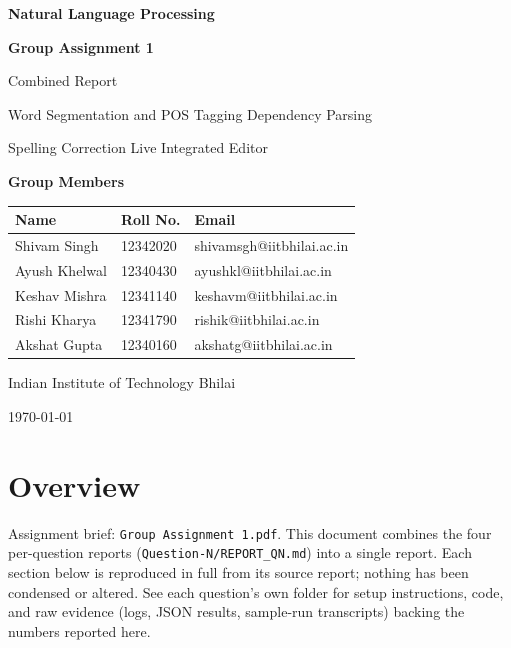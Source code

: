 \documentclass[11pt,a4paper]{article}
\begin{document}
\begin{titlepage}
\centering
\vspace*{3cm}
{\Huge\bfseries Natural Language Processing\par}
\vspace{6pt}
{\Huge\bfseries Group Assignment 1\par}
\vspace{18pt}
{\LARGE Combined Report\par}
\vspace{10pt}
{\large Word Segmentation and POS Tagging \textperiodcentered{} Dependency Parsing\par}
{\large Spelling Correction \textperiodcentered{} Live Integrated Editor\par}
\vspace{28pt}
{\large\bfseries Group Members\par}
\vspace{8pt}
\begin{tabular}{lll}
\toprule
\textbf{Name} & \textbf{Roll No.} & \textbf{Email} \\
\midrule
Shivam Singh   & 12342020 & shivamsgh@iitbhilai.ac.in \\
Ayush Khelwal  & 12340430 & ayushkl@iitbhilai.ac.in \\
Keshav Mishra  & 12341140 & keshavm@iitbhilai.ac.in \\
Rishi Kharya   & 12341790 & rishik@iitbhilai.ac.in \\
Akshat Gupta   & 12340160 & akshatg@iitbhilai.ac.in \\
\bottomrule
\end{tabular}
\vfill
{\large Indian Institute of Technology Bhilai\par}
\vspace{4pt}
{\large \today\par}
\end{titlepage}

\tableofcontents
\clearpage
\section*{Overview}

Assignment brief: \texttt{Group Assignment 1.\allowbreak{}pdf}. This document combines the four per-question reports (\texttt{Question-\allowbreak{}N/\allowbreak{}REPORT\_\allowbreak{}QN.\allowbreak{}md}) into a single report. Each section below is reproduced in full from its source report; nothing has been condensed or altered. See each question's own folder for setup instructions, code, and raw evidence (logs, JSON results, sample-run transcripts) backing the numbers reported here.
\end{document}

